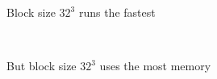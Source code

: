 \begin{frame}[fragile,label=ss-recent-cosmology] 
\secframetitle{\ssRecentCosmology}
\centerline{Block size $32^3$ runs the fastest}
\begin{center}
\begin{minipage}{3.5in}
\end{minipage} \ 
\end{center}
\end{frame}

\begin{frame}[fragile,label=ss-recent-cosmology] 
\secframetitle{\ssRecentCosmology}
\centerline{But block size $32^3$ uses the most memory}
\begin{center}
\begin{minipage}{3.5in}
\end{minipage} \ 
\end{center}
\end{frame}

